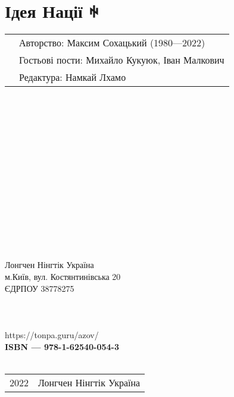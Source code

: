 \section*{Ідея Нації ꑭ}

\begin{tabular}{ll}
& Авторство: Максим Сохацький (1980—2022)\\
& Гостьові пости: Михайло Кукуюк, Іван Малкович\\
& Редактура: Намкай Лхамо\\
\end{tabular}
\\
\\
\\
\\
\\
\\
\\
\\
\\
\\
\\
\\
\\
\\
Лонгчен Нінгтік Україна \\
м.Київ, вул. Костянтинівська 20 \\
ЄДРПОУ 38778275 \\
\\
\\
\\
https://tonpa.guru/azov/ \\

{\bf  ISBN — 978-1-62540-054-3 \hspace{2em}} \\ \\

\begin{tabular}{ll}
\textcopyright{} 2022 & Лонгчен Нінгтік Україна
\end{tabular}
